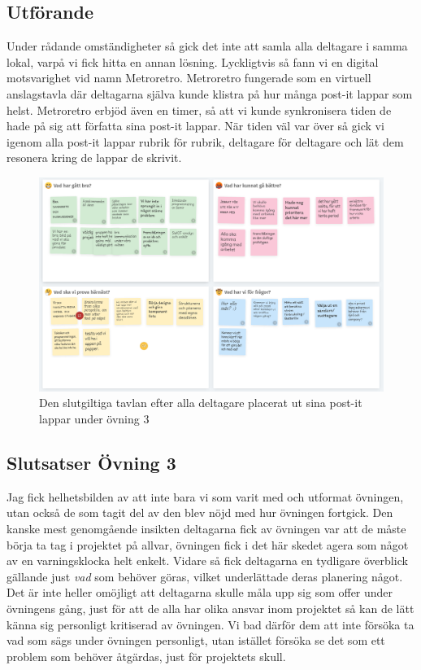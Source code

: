 \documentclass[a4paper, titlepage,12pt]{article}
\begin{document}
			\subsection{Utförande}
				
				Under rådande omständigheter så gick det inte att samla alla deltagare i samma lokal, varpå vi fick hitta en annan lösning. Lyckligtvis så fann vi en digital motsvarighet vid namn Metroretro. Metroretro fungerade som en virtuell anslagstavla där deltagarna själva kunde klistra på hur många post-it lappar som helst. Metroretro erbjöd även en timer, så att vi kunde synkronisera tiden de hade på sig att författa sina post-it lappar. När tiden väl var över så gick vi igenom alla post-it lappar rubrik för rubrik, deltagare för deltagare och lät dem resonera kring de lappar de skrivit.

				\begin{figure}[h!]
					\includegraphics[scale=0.35]{./metroretro-1.png}
					\caption{Den slutgiltiga tavlan efter alla deltagare placerat ut sina post-it lappar under övning 3}
				\end{figure}

			\subsection{Slutsatser Övning 3}

				Jag fick helhetsbilden av att inte bara vi som varit med och utformat övningen, utan också de som tagit del av den blev nöjd med hur övningen fortgick. Den kanske mest genomgående insikten deltagarna fick av övningen var att de måste börja ta tag i projektet på allvar, övningen fick i det här skedet agera som något av en varningsklocka helt enkelt. Vidare så fick deltagarna en tydligare överblick gällande just \emph{vad} som behöver göras, vilket underlättade deras planering något. Det är inte heller omöjligt att deltagarna skulle måla upp sig som offer under övningens gång, just för att de alla har olika ansvar inom projektet så kan de lätt känna sig personligt kritiserad av övningen. Vi bad därför dem att inte försöka ta vad som sägs under övningen personligt, utan istället försöka se det som ett problem som behöver åtgärdas, just för projektets skull.
\end{document}
